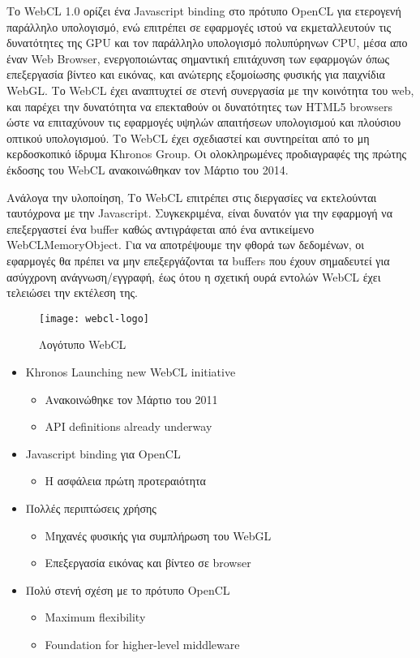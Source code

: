 Το WebCL 1.0 ορίζει ένα Javascript binding στο πρότυπο OpenCL για ετερογενή παράλληλο υπολογισμό, ενώ επιτρέπει σε εφαρμογές ιστού να εκμεταλλευτούν τις δυνατότητες της GPU και τον παράλληλο υπολογισμό πολυπύρηνων CPU, μέσα απο έναν Web Browser, ενεργοποιώντας σημαντική επιτάχυνση των εφαρμογών όπως επεξεργασία βίντεο και εικόνας, και ανώτερης εξομοίωσης φυσικής για παιχνίδια WebGL. Το WebCL έχει αναπτυχτεί σε στενή συνεργασία με την κοινότητα του web, και παρέχει την δυνατότητα να επεκταθούν οι δυνατότητες των HTML5 browsers ώστε να επιταχύνουν τις εφαρμογές υψηλών απαιτήσεων υπολογισμού και πλούσιου οπτικού υπολογισμού. Το WebCL έχει σχεδιαστεί και συντηρείται από το μη κερδοσκοπικό ίδρυμα Khronos Group. Οι ολοκληρωμένες προδιαγραφές της πρώτης έκδοσης του WebCL ανακοινώθηκαν τον Μάρτιο του 2014.\cite{opencl-5} 

Ανάλογα την υλοποίηση, Το WebCL επιτρέπει στις διεργασίες να εκτελούνται ταυτόχρονα με την Javascript. Συγκεκριμένα, είναι δυνατόν για την εφαρμογή να επεξεργαστεί ένα buffer καθώς αντιγράφεται από ένα αντικείμενο WebCLMemoryObject. Για να αποτρέψουμε την φθορά των δεδομένων, οι εφαρμογές θα πρέπει να μην επεξεργάζονται τα buffers που έχουν σημαδευτεί για ασύγχρονη ανάγνωση/εγγραφή, έως ότου η σχετική ουρά εντολών WebCL έχει τελειώσει την εκτέλεση της.

\begin{figure}[h]
	\texttt{[image: webcl-logo]}
	\centering
	\caption{Λογότυπο WebCL}
\end{figure}
\begin{itemize}
\item Khronos Launching new WebCL initiative
	\begin{itemize}
	\item Ανακοινώθηκε τον Μάρτιο του 2011
	\item API definitions already underway
	\end{itemize}
\item Javascript binding για OpenCL
	\begin{itemize}
	\item Η ασφάλεια πρώτη προτεραιότητα
	\end{itemize}
\item Πολλές περιπτώσεις χρήσης
	\begin{itemize}
	\item Μηχανές φυσικής για συμπλήρωση του WebGL
	\item Επεξεργασία εικόνας και βίντεο σε browser
	\end{itemize}
\item Πολύ στενή σχέση με το πρότυπο OpenCL
	\begin{itemize}
	\item Maximum flexibility
	\item Foundation for higher-level middleware
	\end{itemize}
\end{itemize}


